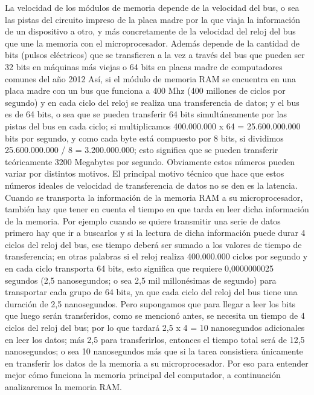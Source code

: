 \documentclass{article}
\begin{document}
La velocidad de los módulos de memoria depende de la velocidad del bus, o sea las pistas del
circuito impreso de la placa madre por la que viaja la información de un dispositivo a otro, y
más concretamente de la velocidad del reloj del bus que une la memoria con el
microprocesador. Además depende de la cantidad de bits (pulsos eléctricos) que se transfieren
a la vez a través del bus que pueden ser 32 bits en máquinas más viejas o 64 bits en placas
madre de computadores comunes del año 2012
Así, si el módulo de memoria RAM se encuentra en una placa madre con un bus que funciona a
400 Mhz (400 millones de ciclos por segundo) y en cada ciclo del reloj se realiza una
transferencia de datos; y el bus es de 64 bits, o sea que se pueden transferir 64 bits
simultáneamente por las pistas del bus en cada ciclo; si multiplicamos 400.000.000 x 64 =
25.600.000.000 bits por segundo, y como cada byte está compuesto por 8 bits, si dividimos
25.600.000.000 / 8 = 3.200.000.000; esto significa que se pueden transferir teóricamente 3200
Megabytes por segundo. Obviamente estos números pueden variar por distintos motivos.
El principal motivo técnico que hace que estos números ideales de velocidad de transferencia
de datos no se den es la latencia. Cuando se transporta la información de la memoria RAM a su
microprocesador, también hay que tener en cuenta el tiempo en que tarda en leer dicha
información de la memoria. Por ejemplo cuando se quiere transmitir una serie de datos primero
hay que ir a buscarlos y si la lectura de dicha información puede durar 4 ciclos del reloj del bus,
ese tiempo deberá ser sumado a los valores de tiempo de transferencia; en otras palabras si el
reloj realiza 400.000.000 ciclos por segundo y en cada ciclo transporta 64 bits, esto significa
que requiere 0,0000000025 segundos (2,5 nanosegundos; o sea 2,5 mil millonésimas de
segundo) para transportar cada grupo de 64 bits, ya que cada ciclo del reloj del bus tiene una
duración de 2,5 nanosegundos. Pero supongamos que para llegar a leer los bits que luego serán
transferidos, como se mencionó antes, se necesita un tiempo de 4 ciclos del reloj del bus; por lo
que tardará 2,5 x 4 = 10 nanosegundos adicionales en leer los datos; más 2,5 para transferirlos,
entonces el tiempo total será de 12,5 nanosegundos; o sea 10 nanosegundos más que si la tarea
consistiera únicamente en transferir los datos de la memoria a su microprocesador.
Por eso para entender mejor cómo funciona la memoria principal del computador, a continuación analizaremos la memoria RAM.
\end{document}
